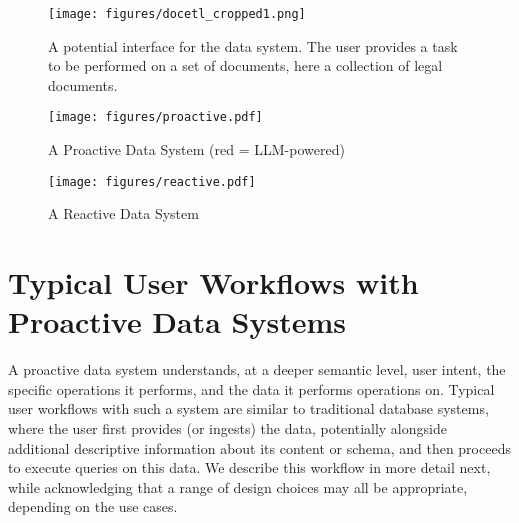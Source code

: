 
\begin{figure}
    \centering
    \texttt{[image: figures/docetl\_cropped1.png]}
    \caption{A potential interface for the data system. The user provides a task to be performed on a set of documents, here a collection of legal documents.}
    \label{fig:docetl}
\end{figure}

\begin{figure*}[t!]
\centering
\begin{minipage}{0.55\textwidth}
    \centering
    \texttt{[image: figures/proactive.pdf]}
    \vspace{-15pt}
    \caption{A Proactive Data System (red = LLM-powered)}
    \label{fig:proactive}
\end{minipage}
\begin{minipage}{0.4\textwidth}
    \centering
    \texttt{[image: figures/reactive.pdf]}
    \vspace{-10pt}
    \caption{A Reactive Data System}
    \label{fig:reactive}
\end{minipage}
\vspace{-10pt}
\end{figure*}

\section{Typical User Workflows with Proactive Data Systems}

A proactive data system
understands, at a deeper semantic level, 
user intent,
the specific operations it performs,
and the data it performs operations on.
Typical user workflows with 
such a system are similar to
traditional database systems,
where the user
first provides (or ingests)
the data, potentially
alongside additional descriptive
information about its content or schema,
and then proceeds
to execute queries on this data.
We describe this workflow in more detail next,
while acknowledging that
a range of design choices may all
be appropriate,
depending on the use cases. 

